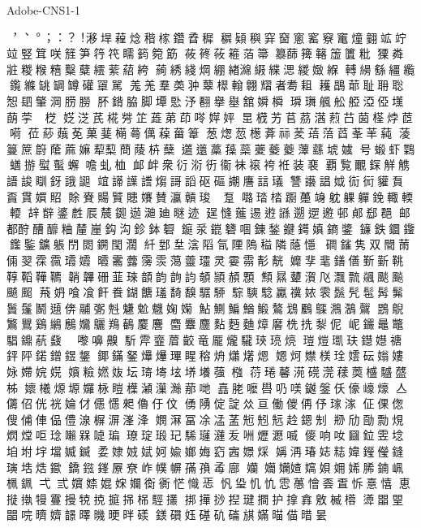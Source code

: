 Adobe-CNS1-1

︐︑︒︔︓︖︕𣻗垾𦻓焾𥟠榢𨯩孴穉
𥣡𩓙穥穽𥦬窻窰竂竃燑𦒍䇊竚
竝竪䇯咲𥰁笋筕笩𥌎𥳾箢筯
莜𥮴𦱿篐萡箒𥴠蒒篺簵𥳁籄粃
𤢂粦𤕸糉糇糦糳糵繧䔝𦹄絝
𦻖綉綫焵綳緖𤁗𦀩緤㴓緵𡟹緥
𨍭𦄡𦅚繮䌫鑬縧罀罁罇礶𦋐駡
羗𦍑羣𡙡𠁨䕜𣝦𨌺翺𦒉者耈耝
耯𪂇𦳃耻耼聡𢜔䦉𦘦𣷣𦛨朥
肧𨩈脇脚墰𢛶汿𦒘擧𡒊舘𡡞橓
𤩥𤪕䑺舩𦩒𣵾俹𡓽蓢荢芑𤦧𣔰
𡝳𣷸芪椛芳䇛蕋苐茚𠸖𡞴㛁
𣅽𣕚艻苢茘𣺋𦶣𦬅𦮗𣗎㶿茝嗬
莅䔋𦶥莬菓𦻔橗蕚㒖𦹂葘𥯤
葱㷓䓤檧葊祘𦮖𦹷𦹃蓞莑䒠蒓
蓤𥲑䉀𥳀䕃蔴嫲䔣䔧蕳䔖枿蘖
𨘥𨘻藁𧂈蘂𡖂𧃍䕫䕪蘨㙈𡢢
号𧎚虾𪃸蟮𢰧螱蟚蠏噡虬桖
䘏衅衆𧗠𣶹𧗤衞袜䙛袴袵装𧜏
覇覧覼𨨥觧𧤤𧪽誜瞓釾誐𧩙
竩𧬺䜓𧬸煼謌謟𥐰𥕥謿譍誩𤩺
讐讛誯𡛟䘕衏貛𧵔𧶏貫㜥𧵓
賖𧶘𧶽贒贃𡤐賛灜贑㻐起趩𨀂
𡀔𤦊㭼𨆼𧄌竧躭躶軃鋔輙輭𨍥
𨐒辥錃𪊟𠩐辳𨧞𨔽𣶻廸𣉢迹
𢌥㦀𦻗逷𨔼𧪾遡𨕬𨘋邨𨜓郄𨛦
邮都酧醩釄粬𨤳𡺉鈎沟鉁鉢𥖹
𨫆𣲛𨬌𥗛𠴱錬鍫𨫡𨯫嫃𨫢𨫥
䥥鉄𨯬𨰹𨯿鍳鑛躼閅閦鐦閠濶
䊹𨛘𡉼𣸮䧟氜陻隖䅬隣𦻕懚
磵𨫠隽双䦡𦲸𠉴𦐐𩂯𩃥𤫑𡤕
𣌊霱虂霶䨏䔽䖅𤫩灵孁霛𩇕靗
孊𩇫靟鐥僐𣂷𣂼鞉鞟鞱鞾韀
韒韠𥑬韮琜𩐳韵𩐝𧥺䫑頴頳顋
顦㬎𧅵㵑𠘰𤅜𥜆飊颷飈飇䫿
𦴧𡛓喰飡飦飬鍸餹𤨩䭲𩡗𩤅駵
騌騻騐驘𥜥㛄𩂱𩯕髠髢𩬅髴
䰎鬔鬭𨘀倴鬴㣃𣁽魐魀𩴾婅𡡣
鮎鰂鯿鰌𩹨鷔𩾷𪆒𪆫𪃡𪄣𪇟
鵾鶃𪄴鸎鷄𪆓𪈠𡤻𪈳鴹𪂹𪊴麐
麕麞麢䴴麪麯𤍤黁㭠㧥㴝伲
㞾𨰫鼂鼈䮖鐤𦶢鼗鼖鼹嚟嚊齅
馸𩂋韲葿齩竜龎爖䮾𤥵𤦻煷
𤧸𤍈𤩑玞𨯚𡣺禟𨥾𨸶鍩鏳𨩄鋬
鎁鏋𨥬𤒹爗㻫睲穃烐𤑳𤏸煾
𡟯炣𡢾𣖙㻇𡢅𥐯𡟸㜢𡛻𡠹㛡𡝴
𡣑𥽋㜣𡛀坛𤨥𡏾𡊨𡏆𡒶蔃𣚦
葕𤦔𧅥𣸱𥕜𣻻𧁒䓴𣛮𩦝𦼦柹
㜳㰕㷧塬𡤢栐䁗𣜿𤃡𤂋𤄏𦰡哋
嚞𦚱嚒𠿟𠮨𠸍𨬓鎜仸儫㠙𤐶
亼𠑥佋侊𥙑婨𠆫𠏋㦙𠌊𠐔㐵伩
𠋀𨺳𠉵諚𠈌亘働儍侢伃𤨎𣺊
佂倮偬傁俌俥偘僼湶𣖕𣸹𣺿浲
𡢄𣺉冨凃𠗠䓝𠒣𠒒𠒑赺𨪜𠜎
剙劤𠡳勡䙺熌𤎌𠰠𤦬𡃤槑𠸝㻞
璙琔瑖玘䮎𤪼𤂍叐㖄爏𤃉喴
𠍅响𠯆圝鉝雴埝垍坿㘾壋媙𨩆
𡛺𡝯𡜐娬妸婾嫏娒𥥆𡧳𡡡𤊕
㛵洅瑃娡𥺃媁𨯗𠐓鏠璌𡌃焅䥲
鐈𨧻鎽㞠尞岞幞幈𡦖𡥼𣫮廍
孏𡤃𡤄㜁𡢠㛝𡛾㛓脪𨩇𡶺𣑲𨦨
弌弎𡤧𡞫婫𡜻孄𧗽衠恾𢡠𢘫
忛㺸𢖯𢖾𩂈𦽳懀𠀾𠁆𢘛憙憘
恵𢲛𢴇𤛔𩅍摱𤙥𢭪㨩𢬢𣑐𩣪𢹸
挷撶挱揑𤧣𢵧护𢲡搻敫楲㯴
𣂎𣊭𤦉𣊫唍𣋠𡣙𩐿曎𣊉𣆳㫠𥖄
𨬢𥖏𡛼𥕛𥐥磮𣄃𡠪𣈴㑤𣈏𣆂
